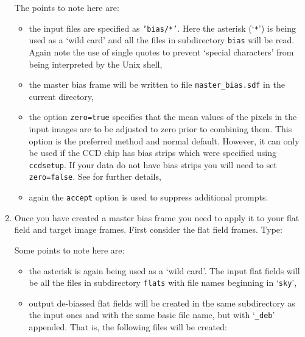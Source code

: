 \documentclass[twoside,11pt]{starlink}
\begin{document}
\begin{enumerate}
   The points to note here are:

  \begin{itemize}

    \item the input files are specified as \texttt{'bias/*'}.  Here the
     asterisk (`\texttt{*}') is being used as a `wild card' and all the
     files in subdirectory \texttt{bias} will be read.  Again note the
     use of single quotes to prevent `special characters' from being
     interpreted by the Unix shell,

    \item the master bias frame will be written to file \texttt{master\_bias.sdf} in the current directory,

    \item the option \texttt{zero=true} specifies that the mean values of
     the pixels in the input images are to be adjusted to zero prior
     to combining them.  This option is the preferred method and normal
     default.  However, it can only be used if the CCD chip has bias
     strips which were specified using \texttt{ccdsetup}.  If your data
     do not have bias strips you will need to set \texttt{zero=false}.
     See  for further details,

    \item again the \texttt{accept} option is used to suppress additional
     prompts.

  \end{itemize}

  \item Once you have created a master bias frame you need to apply it
   to your flat field and target image frames.  First consider the
   flat field frames.  Type:

\begin{terminalv}
\end{terminalv}

   Some points to note here are:

  \begin{itemize}

    \item the asterisk is again being used as a `wild card'.  The input
     flat fields will be all the files in subdirectory \texttt{flats} with
     file names beginning in `\texttt{sky}',

    \item output de-biassed flat fields will be created in the same
     subdirectory as the input ones and with the same basic file name,
     but with `\texttt{\_deb}' appended.  That is, the following files will
     be created:


\end{itemize}
\end{enumerate}
\end{document}
